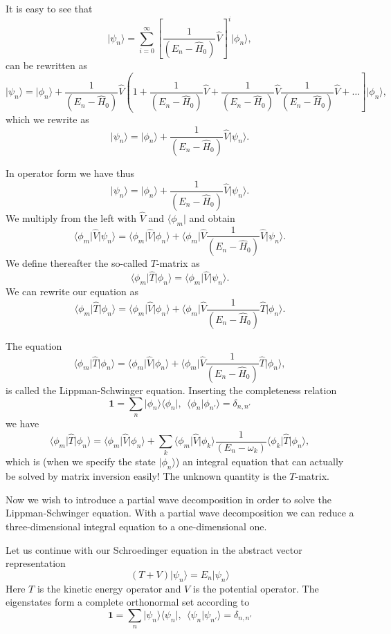 \documentclass[graybox,sectrefs,envcountresetchap,open=right]{svmonodo}
\begin{document}
It is easy to see that 
\[
\vert \psi_n \rangle =\sum_{i=0}^{\infty}\left[\frac{1}{(E_n -\hat{H}_0)}\hat{V}\right]^i\vert \phi_n \rangle,
\]
can be rewritten as 
\[
\vert \psi_n \rangle =\vert\phi_n \rangle+\frac{1}{( E_n -\hat{H}_0)}
\hat{V}\left(1+ \frac{1}{(E_n -\hat{H}_0)}\hat{V}+\frac{1}{(E_n -\hat{H}_0)}\hat{V}\frac{1}{(E_n -\hat{H}_0)}\hat{V}+\dots\right]\vert \phi_n \rangle,
\]
which we rewrite as 
\[
\vert \psi_n \rangle =\vert\phi_n \rangle+\frac{1}{(E_n -\hat{H}_0)}\hat{V}\vert \psi_n \rangle.
\]


In operator form we have thus
\[
\vert \psi_n \rangle =\vert\phi_n \rangle+\frac{1}{(E_n -\hat{H}_0)}\hat{V}\vert \psi_n \rangle.
\]
We multiply from the left with $\hat{V}$ and $\langle \phi_m \vert$ and obtain
\[
\langle \phi_m \vert\hat{V}\vert \psi_n \rangle =\langle \phi_m \vert\hat{V}\vert\phi_n \rangle+\langle \phi_m \vert\hat{V}\frac{1}{(E_n -\hat{H}_0)}\hat{V}\vert \psi_n \rangle.
\]
We define thereafter the so-called $T$-matrix as
\[
\langle \phi_m \vert\hat{T}\vert \phi_n \rangle=\langle \phi_m \vert\hat{V}\vert \psi_n \rangle.
\]
We can rewrite our equation as
\[
\langle \phi_m \vert\hat{T}\vert \phi_n \rangle =\langle \phi_m \vert\hat{V}\vert\phi_n \rangle+\langle \phi_m \vert\hat{V}\frac{1}{(E_n -\hat{H}_0)}\hat{T}\vert \phi_n \rangle.
\]


The equation
\[
\langle \phi_m \vert\hat{T}\vert \phi_n \rangle =\langle \phi_m \vert\hat{V}\vert\phi_n \rangle+\langle \phi_m \vert\hat{V}\frac{1}{(E_n -\hat{H}_0)}\hat{T}\vert \phi_n \rangle,
\]
is called the Lippman-Schwinger equation. Inserting the completeness relation
\[ 
\mathbf{1} = \sum_n \vert \phi_n\rangle\langle \phi_n \vert, \:\: \langle \phi_n\vert \phi_{n'} \rangle = \delta_{n,n'}
\]
we have 
\[
\langle \phi_m \vert\hat{T}\vert \phi_n \rangle =\langle \phi_m \vert\hat{V}\vert\phi_n \rangle+\sum_k \langle \phi_m \vert\hat{V}\vert \phi_k\rangle\frac{1}{(E_n -\omega_k)}\langle \phi_k \vert\hat{T}\vert \phi_n \rangle,
\]
which is (when we specify the state $\vert\phi_n \rangle$) an integral equation that can actually be solved by matrix inversion easily! The unknown quantity is the $T$-matrix.


Now we wish to introduce a partial wave decomposition in order to solve the Lippman-Schwinger equation. With a partial wave decomposition we can reduce a three-dimensional integral equation to a one-dimensional one. 

Let us continue with our Schroedinger equation in the abstract vector representation
\[
\left(T + V\right)\vert\psi_n\rangle = E_n\vert\psi_n \rangle 
\]
Here $T$ is the kinetic energy operator and $V$ is the potential operator. 
The eigenstates form a complete orthonormal set according to 
\[ 
\mathbf{1}=\sum_n\vert\psi_n\rangle\langle\psi_n\vert, \:\: \langle\psi_n\vert\psi_{n'}\rangle =\delta_{n,n'}
\]
\end{document}
